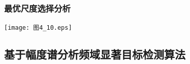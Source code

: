 \documentclass[notheorems,mathserif,table,compress]{beamer}  %
\begin{document}


\begin{frame}
  \frametitle{最优尺度选择分析}
\begin{center}
\texttt{[image: 图4\_10.eps]}%
\end{center}

\end{frame}

\subsection{基于幅度谱分析频域显著目标检测算法}


\end{document}
